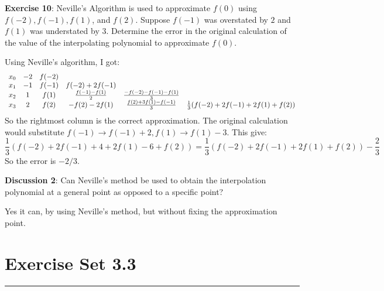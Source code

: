 \documentclass{article}
\begin{document}
\textbf{Exercise 10}: Neville's Algorithm is used to approximate $f(0)$ using $f(-2), f(-1), f(1)$, and $f(2)$. Suppose $f(-1)$ was overstated by $2$ and $f(1)$ was understated by $3$. Determine the error in the original calculation of the value of the interpolating polynomial to approximate $f(0)$.
    \begin{answer}
        Using Neville's algorithm, I got:
            \begin{align*}
                \begin{array}{ c c c c c c }
                    x_{0} & -2 & f(-2) &                        &                                 &                                            \\
                    x_{1} & -1 & f(-1) & f(-2) + 2f(-1)         &                                 &                                            \\
                    x_{2} & 1  & f(1)  & \frac{f(-1) - f(1)}{2} & \frac{-f(-2) - f(-1) - f(1)}{3} &                                            \\
                    x_{3} & 2  & f(2)  & -f(2) - 2f(1)          & \frac{f(2) + 3f(1) - f(-1)}{3}  & \frac{1}{3}(f(-2) + 2f(-1) + 2f(1) + f(2))   
                \end{array}
            \end{align*}
        So the rightmost column is the correct approximation. The original calculation would substitute $f(-1) \rightarrow f(-1) + 2, f(1) \rightarrow f(1) - 3$. This give:
            \begin{equation*}
                \dfrac{1}{3}(f(-2) + 2f(-1) + 4 + 2f(1) - 6 + f(2)) = \dfrac{1}{3}(f(-2) + 2f(-1) + 2f(1) + f(2)) - \dfrac{2}{3}
            \end{equation*}
        So the error is $-2/3$.
    \end{answer}

\textbf{Discussion 2}: Can Neville's method be used to obtain the interpolation polynomial at a general point as opposed to a specific point?
    \begin{answer}
        Yes it can, by using Neville's method, but without fixing the approximation point.
    \end{answer}

\newpage
\section*{Exercise Set 3.3}
\hrule
\end{document}
